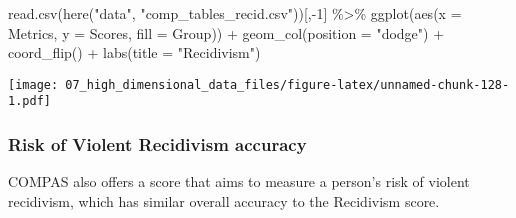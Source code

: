 \documentclass[
]{book}
\newenvironment{Shaded}{\begin{snugshade}}{\end{snugshade}}
\newcommand{\AttributeTok}[1]{\textcolor[rgb]{0.77,0.63,0.00}{#1}}
\newcommand{\DecValTok}[1]{\textcolor[rgb]{0.00,0.00,0.81}{#1}}
\newcommand{\FunctionTok}[1]{\textcolor[rgb]{0.00,0.00,0.00}{#1}}
\newcommand{\NormalTok}[1]{#1}
\newcommand{\SpecialCharTok}[1]{\textcolor[rgb]{0.00,0.00,0.00}{#1}}
\newcommand{\StringTok}[1]{\textcolor[rgb]{0.31,0.60,0.02}{#1}}
\begin{document}
\begin{Shaded}
\begin{Highlighting}[]
\FunctionTok{read.csv}\NormalTok{(}\FunctionTok{here}\NormalTok{(}\StringTok{"data"}\NormalTok{, }\StringTok{"comp\_tables\_recid.csv"}\NormalTok{))[,}\SpecialCharTok{{-}}\DecValTok{1}\NormalTok{] }\SpecialCharTok{\%\textgreater{}\%}
  \FunctionTok{ggplot}\NormalTok{(}\FunctionTok{aes}\NormalTok{(}\AttributeTok{x =}\NormalTok{ Metrics, }\AttributeTok{y =}\NormalTok{ Scores, }\AttributeTok{fill =}\NormalTok{ Group)) }\SpecialCharTok{+}
  \FunctionTok{geom\_col}\NormalTok{(}\AttributeTok{position =} \StringTok{"dodge"}\NormalTok{) }\SpecialCharTok{+}
  \FunctionTok{coord\_flip}\NormalTok{() }\SpecialCharTok{+}
  \FunctionTok{labs}\NormalTok{(}\AttributeTok{title =} \StringTok{"Recidivism"}\NormalTok{)}
\end{Highlighting}
\end{Shaded}

\texttt{[image: 07\_high\_dimensional\_data\_files/figure-latex/unnamed-chunk-128-1.pdf]}

\hypertarget{risk-of-violent-recidivism-accuracy}{%
\subsubsection{Risk of Violent Recidivism accuracy}\label{risk-of-violent-recidivism-accuracy}}

COMPAS also offers a score that aims to measure a person's risk of violent recidivism, which has similar overall accuracy to the Recidivism score.
\end{document}
